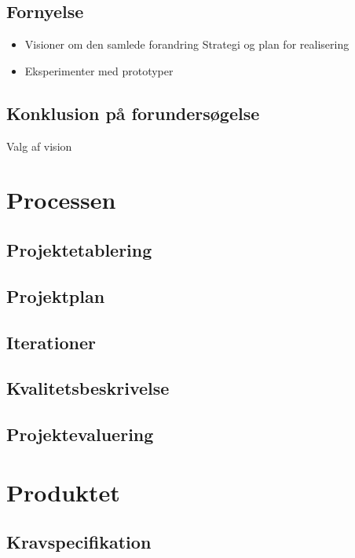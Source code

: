 \documentclass[12pt, a4paper]{report}
\begin{document}
\section{Fornyelse}
\begin{itemize}
\item Visioner om den samlede forandring
Strategi og plan for realisering
\item Eksperimenter med prototyper
\end{itemize}

\section*{Konklusion på forundersøgelse}
Valg af vision

\chapter{Processen}
\section{Projektetablering}


\section{Projektplan}


\section{Iterationer}


\section{Kvalitetsbeskrivelse}


\section{Projektevaluering}


\chapter{Produktet}
\section{Kravspecifikation}

\end{document}
